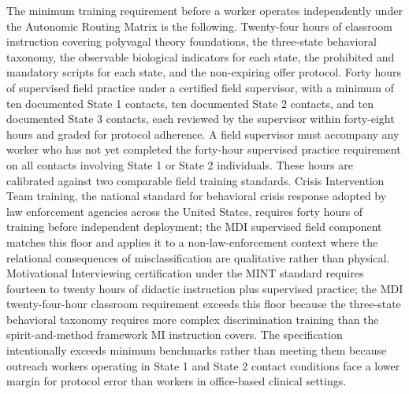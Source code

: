 \documentclass[12pt, letterpaper]{article}
\begin{document}
The minimum training requirement before a worker operates independently under the Autonomic Routing Matrix is the following. Twenty-four hours of classroom instruction covering polyvagal theory foundations, the three-state behavioral taxonomy, the observable biological indicators for each state, the prohibited and mandatory scripts for each state, and the non-expiring offer protocol. Forty hours of supervised field practice under a certified field supervisor, with a minimum of ten documented State 1 contacts, ten documented State 2 contacts, and ten documented State 3 contacts, each reviewed by the supervisor within forty-eight hours and graded for protocol adherence. A field supervisor must accompany any worker who has not yet completed the forty-hour supervised practice requirement on all contacts involving State 1 or State 2 individuals. These hours are calibrated against two comparable field training standards. Crisis Intervention Team training, the national standard for behavioral crisis response adopted by law enforcement agencies across the United States, requires forty hours of training before independent deployment; the MDI supervised field component matches this floor and applies it to a non-law-enforcement context where the relational consequences of misclassification are qualitative rather than physical. Motivational Interviewing certification under the MINT standard requires fourteen to twenty hours of didactic instruction plus supervised practice; the MDI twenty-four-hour classroom requirement exceeds this floor because the three-state behavioral taxonomy requires more complex discrimination training than the spirit-and-method framework MI instruction covers. The specification intentionally exceeds minimum benchmarks rather than meeting them because outreach workers operating in State 1 and State 2 contact conditions face a lower margin for protocol error than workers in office-based clinical settings.
\end{document}
